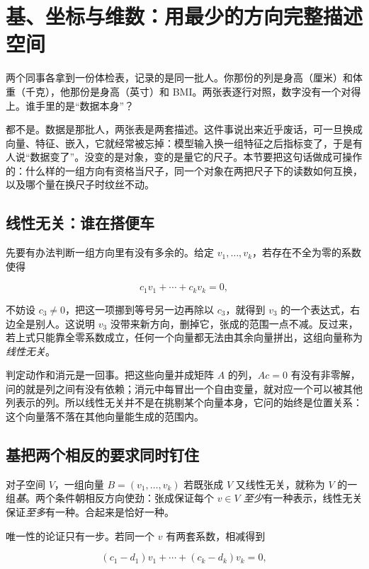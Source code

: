 \section{基、坐标与维数：用最少的方向完整描述空间}
\label{sec:03-Linear-Algebra/02-Vector-Spaces/02}

两个同事各拿到一份体检表，记录的是同一批人。你那份的列是身高（厘米）和体重（千克），他那份是身高（英寸）和 BMI。两张表逐行对照，数字没有一个对得上。谁手里的是``数据本身''？

都不是。数据是那批人，两张表是两套描述。这件事说出来近乎废话，可一旦换成向量、特征、嵌入，它就经常被忘掉：模型输入换一组特征之后指标变了，于是有人说``数据变了''。没变的是对象，变的是量它的尺子。本节要把这句话做成可操作的：什么样的一组方向有资格当尺子，同一个对象在两把尺子下的读数如何互换，以及哪个量在换尺子时纹丝不动。

\subsection{线性无关：谁在搭便车}

先要有办法判断一组方向里有没有多余的。给定 \(v_1,\ldots,v_k\)，若存在不全为零的系数使得

\[
c_1v_1+\cdots+c_kv_k=0,
\]

不妨设 \(c_3\neq0\)，把这一项挪到等号另一边再除以 \(c_3\)，就得到 \(v_3\) 的一个表达式，右边全是别人。这说明 \(v_3\) 没带来新方向，删掉它，张成的范围一点不减。反过来，若上式只能靠全零系数成立，任何一个向量都无法由其余向量拼出，这组向量称为\emph{线性无关}。

判定动作和消元是一回事。把这些向量并成矩阵 \(A\) 的列，\(Ac=0\) 有没有非零解，问的就是列之间有没有依赖；消元中每冒出一个自由变量，就对应一个可以被其他列表示的列。所以线性无关并不是在挑剔某个向量本身，它问的始终是位置关系：这个向量落不落在其他向量能生成的范围内。

\subsection{基把两个相反的要求同时钉住}

对子空间 \(V\)，一组向量 \(B=(v_1,\ldots,v_k)\) 若既张成 \(V\) 又线性无关，就称为 \(V\) 的一组\emph{基}。两个条件朝相反方向使劲：张成保证每个 \(v\in V\) \emph{至少}有一种表示，线性无关保证\emph{至多}有一种。合起来是恰好一种。

唯一性的论证只有一步。若同一个 \(v\) 有两套系数，相减得到

\[
(c_1-d_1)v_1+\cdots+(c_k-d_k)v_k=0,
\]

